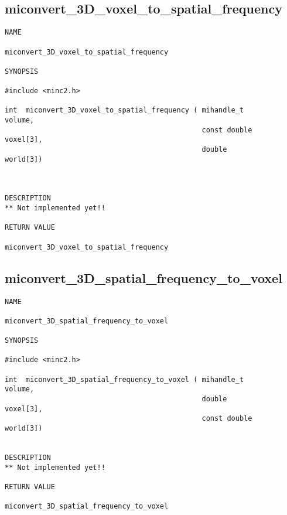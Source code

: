 \documentclass{article}
\begin{document}
\subsection{miconvert\_3D\_voxel\_to\_spatial\_frequency}
\begin{verbatim}
NAME 

miconvert_3D_voxel_to_spatial_frequency

SYNOPSIS

#include <minc2.h>

int  miconvert_3D_voxel_to_spatial_frequency ( mihandle_t            volume,
                                               const double          voxel[3],
                                               double                world[3])
                                   
                       
                                
DESCRIPTION
** Not implemented yet!!

RETURN VALUE

miconvert_3D_voxel_to_spatial_frequency
\end{verbatim}

\subsection{miconvert\_3D\_spatial\_frequency\_to\_voxel}
\begin{verbatim}
NAME 

miconvert_3D_spatial_frequency_to_voxel

SYNOPSIS

#include <minc2.h>

int  miconvert_3D_spatial_frequency_to_voxel ( mihandle_t            volume,
                                               double                voxel[3],
                                               const double          world[3])
                       
                                
DESCRIPTION
** Not implemented yet!!

RETURN VALUE

miconvert_3D_spatial_frequency_to_voxel
\end{verbatim}
\end{document}
